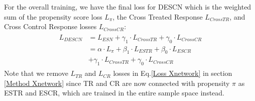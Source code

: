 \documentclass[sigconf]{acmart}
\begin{document}
For the overall training, we have the final loss for DESCN which is the weighted sum of the propensity score loss $L_{\pi}$, the Cross Treated Response $L_{Cross TR}$, and Cross Control Response losses $L_{Cross CR}$:
\begin{align}
    \begin{aligned}
        L_{DESCN} &= L_{ESN} + \gamma_1 \cdot L_{Cross TR} + \gamma_0 \cdot L_{Cross CR} \\
            &= \alpha \cdot L_{\pi} + \beta_1 \cdot L_{ESTR} + \beta_0 \cdot L_{ESCR} \\ 
            &+ \gamma_1 \cdot L_{Cross TR} + \gamma_0 \cdot L_{Cross CR}
    \end{aligned}
\end{align}
Note that we remove $L_{TR}$ and $L_{CR}$ losses in Eq.\eqref{Loss Xnetwork} in section \ref{Method Xnetwork} since TR and CR are now connected with propensity $\pi$ as ESTR and ESCR, which are trained in the entire sample space instead.
\end{document}

